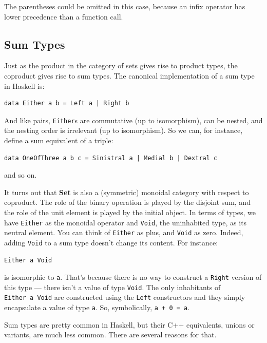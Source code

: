 \noindent
The parentheses could be omitted in this case, because an infix operator
has lower precedence than a function call.

\subsection{Sum Types}\label{sum-types}

Just as the product in the category of sets gives rise to product types,
the coproduct gives rise to sum types. The canonical implementation of a
sum type in Haskell is:

\begin{verbatim}
data Either a b = Left a | Right b
\end{verbatim}

\noindent
And like pairs, \texttt{Either}s are commutative (up to isomorphism),
can be nested, and the nesting order is irrelevant (up to isomorphism).
So we can, for instance, define a sum equivalent of a triple:

\begin{verbatim}
data OneOfThree a b c = Sinistral a | Medial b | Dextral c
\end{verbatim}

\noindent
and so on.

It turns out that \textbf{Set} is also a (symmetric) monoidal category
with respect to coproduct. The role of the binary operation is played by
the disjoint sum, and the role of the unit element is played by the
initial object. In terms of types, we have \texttt{Either} as the
monoidal operator and \texttt{Void}, the uninhabited type, as its
neutral element. You can think of \texttt{Either} as plus, and
\texttt{Void} as zero. Indeed, adding \texttt{Void} to a sum type
doesn't change its content. For instance:

\begin{verbatim}
Either a Void
\end{verbatim}

\noindent
is isomorphic to \texttt{a}. That's because there is no way to construct
a \texttt{Right} version of this type --- there isn't a value of type
\texttt{Void}. The only inhabitants of \texttt{Either\ a\ Void} are
constructed using the \texttt{Left} constructors and they simply
encapsulate a value of type \texttt{a}. So, symbolically,
\texttt{a\ +\ 0\ =\ a}.

Sum types are pretty common in Haskell, but their C++ equivalents,
unions or variants, are much less common. There are several reasons for
that.

